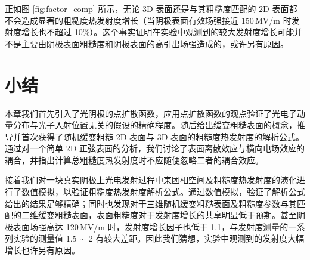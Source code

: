 正如图 \ref{fig:factor_comp} 所示，无论 3D 表面还是与其粗糙度匹配的 2D 表面都不会造成显著的粗糙度热发射度增长（当阴极表面有效场强接近 150\,MV/m 时发射度增长也不超过 10\%）。这个事实证明在实验中观测到的较大发射度增长可能并不是主要由阴极表面粗糙度和阴极表面的高引出场强造成的，或许另有原因。

\section{小结}
本章我们首先引入了光阴极的点扩散函数，应用点扩散函数的观点验证了光电子动量分布与光子入射位置无关的假设的精确程度。随后给出缓变粗糙表面的概念，推导并首次获得了随机缓变粗糙 2D 表面与 3D 表面的粗糙度热发射度的解析公式。通过对一个简单 2D 正弦表面的分析，我们讨论了表面离散效应与横向电场效应的耦合，并指出计算总粗糙度热发射度时不应随便忽略二者的耦合效应。

接着我们对一块真实阴极上光电发射过程中束团相空间及粗糙度热发射度的演化进行了数值模拟，以验证粗糙度热发射度解析公式。通过数值模拟，验证了解析公式给出的结果足够精确；同时也发现对于三维随机缓变粗糙表面及粗糙度参数与其匹配的二维缓变粗糙表面，表面粗糙度对于发射度增长的共享明显低于预期。甚至阴极表面场强高达 120\,MV/m 时，发射度增长因子也低于 1.1，与发射度测量的一系列实验的测量值 1.5 $\sim$ 2 有较大差距。因此我们猜想，实验中观测到的发射度大幅增长也许另有原因。
